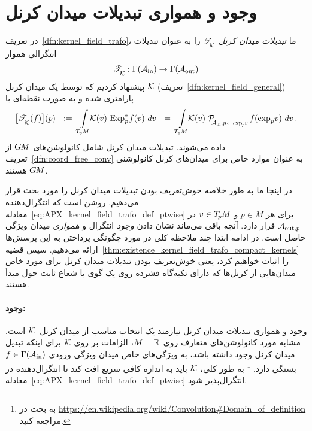 

\section{وجود و همواری تبدیلات میدان کرنل}
\label{apx:smoothness_kernel_field_trafo}


در تعریف~\ref{dfn:kernel_field_trafo}، ما \emph{تبدیلات میدان کرنل} $\mathscr{T}_{\overset{}{\mkern-0mu \mathcal{K}}}$ را به عنوان تبدیلات انتگرالی هموار
\begin{align}
    \mathscr{T}_{\overset{}{\mkern-0mu \mathcal{K}}}: \Gamma(\mathcal{A}_\textup{in})\to \Gamma(\mathcal{A}_\textup{out})
\end{align}
پیشنهاد کردیم که توسط یک میدان کرنل $\mathcal{K}$ (تعریف~\ref{dfn:kernel_field_general}) پارامتری شده و به صورت نقطه‌ای با
\begin{align}\label{eq:APX_kernel_field_trafo_def_ptwise}
    \big[ \TK (f)\big] (p)
    \ \ :=\ 
    \int\limits_{\TpM}\!\!
    \K(v) \,
    \Expspf(v)
    \ dv
    \ \ =\ 
    \int\limits_{\TpM}\!\!
    \K(v) \ 
    \PAinexppv \,
    f(\exp_p\!v)
    \ dv \,.
\end{align}
داده می‌شوند. تبدیلات میدان کرنل شامل کانولوشن‌های $G\mkern-1.4muM$ از تعریف~\ref{dfn:coord_free_conv} به عنوان موارد خاص برای میدان‌های کرنل کانولوشنی $G\mkern-1.4muM$ هستند.

در اینجا ما به طور خلاصه خوش‌تعریف بودن تبدیلات میدان کرنل را مورد بحث قرار می‌دهیم.
روشن است که انتگرال‌دهنده معادله~\eqref{eq:APX_kernel_field_trafo_def_ptwise} برای هر $p\in M$ و $v \in T_{\mkern-1.5mu p}\mkern-.5muM$ در $\mathcal{A}_{\textup{out},p}$ قرار دارد.
آنچه باقی می‌ماند نشان دادن \emph{وجود} انتگرال و \emph{همواری} میدان ویژگی حاصل است.
در ادامه ابتدا چند ملاحظه کلی در مورد چگونگی پرداختن به این پرسش‌ها ارائه می‌دهیم.
سپس قضیه~\ref{thm:existence_kernel_field_trafo_compact_kernels} را اثبات خواهیم کرد، یعنی خوش‌تعریف بودن تبدیلات میدان کرنل برای مورد خاص میدان‌هایی از کرنل‌ها که دارای تکیه‌گاه فشرده روی یک گوی با شعاع ثابت حول مبدأ هستند.







\paragraph{وجود:}
وجود و همواری تبدیلات میدان کرنل نیازمند یک انتخاب مناسب از میدان کرنل~$\mathcal{K}$ است.
مشابه مورد کانولوشن‌های متعارف روی $M=\mathbb{R}$، الزامات بر روی $\mathcal{K}$ برای اینکه تبدیل میدان کرنل وجود داشته باشد، به ویژگی‌های خاص میدان ویژگی ورودی $f\in\Gamma(\mathcal{A}_\textup{in})$ بستگی دارد.%
\footnote{
    به بحث در \url{https://en.wikipedia.org/wiki/Convolution\#Domain_of_definition} مراجعه کنید.
}
به طور کلی، $\mathcal{K}$ باید به اندازه کافی سریع افت کند تا انتگرال‌دهنده در معادله~\eqref{eq:APX_kernel_field_trafo_def_ptwise} انتگرال‌پذیر شود.


